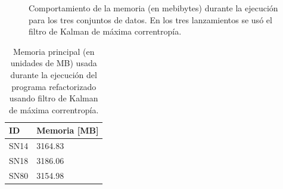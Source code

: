 \begin{figure}[h!]
\centering
{}\hfill
{}\vfill
{}
\caption{Comportamiento de la memoria (en mebibytes) durante la ejecuci\'on para los tres conjuntos de datos. En los tres lanzamientos se us\'o el filtro de Kalman de m\'axima correntrop\'ia.}
\label{fig:mem_new_mcc}
\end{figure}

\begin{table}[h!]
\centering
\caption{Memoria principal (en unidades de MB) usada durante la ejecuci\'on del programa refactorizado usando filtro de Kalman de m\'axima correntrop\'ia.}
\begin{tabular}{|l|l|}
\hline
\textbf{ID} & Memoria [MB]\\\hline\hline
SN14 & 3164.83\\\hline
SN18 & 3186.06\\\hline
SN80 & 3154.98\\\hline
\end{tabular}
\label{tab:mem4}
\end{table}

